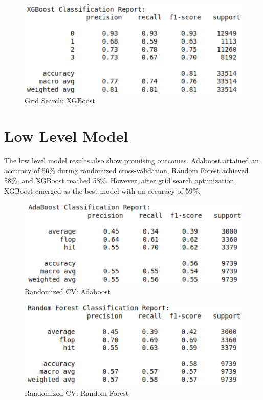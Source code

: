\documentclass[11pt]{report}
\begin{document}
\begin{figure}[H]
    \centering
    \includegraphics[width=0.8\linewidth]{results/highlevel_xgb_grid.png}
    \caption{Grid Search: XGBoost}
\end{figure}

\section{Low Level Model}

The low level model results also show promising outcomes. Adaboost attained an accuracy of 56\% during randomized cross-validation, Random Forest achieved 58\%, and XGBoost reached 58\%. However, after grid search optimization, XGBoost emerged as the best model with an accuracy of 59\%.

\begin{figure}[H]
    \centering
    \includegraphics[width=0.8\linewidth]{results/lowlevel_ada_random.png}
    \caption{Randomized CV: Adaboost}
\end{figure}

\begin{figure}[H]
    \centering
    \includegraphics[width=0.8\linewidth]{results/lowlevel_rf_random.png}
    \caption{Randomized CV: Random Forest}
\end{figure}
\end{document}
